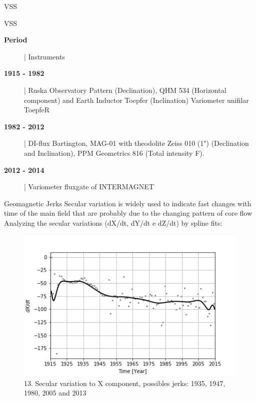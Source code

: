 \documentclass[final,t]{beamer}
\begin{document}
\begin{columns}[t]
\begin{column}{.25\linewidth}
\begin{block}{VSS}
\end{block}


\begin{block}{VSS}
\centering

	\begin{description}
		\item[\textbf{Period}] | \hspace{0.5cm} Instruments 
				
			\item[\textbf{1915 - 1982}]| Ruska Observatory Pattern (Declination), QHM 534 (Horizontal component) and Earth Inductor Toepfer (Inclination) Variometer unifilar ToepfeR
		\end{description}
	
	 	\begin{description}
	 		\item[\textbf{1982 - 2012}]| DI-flux Bartington, MAG-01 with theodolite Zeiss 010 (1") (Declination and Inclination), PPM Geometrics 816 (Total intensity F).
	 	\end{description}
	
	 
	\begin{description}
		\item[\textbf{2012 - 2014}]| Variometer fluxgate of INTERMAGNET
		
	\end{description}
	
\end{block}



\begin{block}{Geomagnetic Jerks}
Secular variation is widely used to indicate fast changes with time of the main field that are probably due to the changing pattern of core flow	
Analyzing the secular variations (dX/dt, dY/dt e dZ/dt) by spline fits: 		
	\begin{figure}
		\centering
		\includegraphics[width=0.8\linewidth]{spline101sv_X_spline}
		\caption{13. Secular variation to X component, possibles jerks: 1935, 1947, 1980, 2005 and 2013}
		\label{SPLINEx}
	\end{figure}
	

\end{block}
\end{column}
\end{columns}
\end{document}
